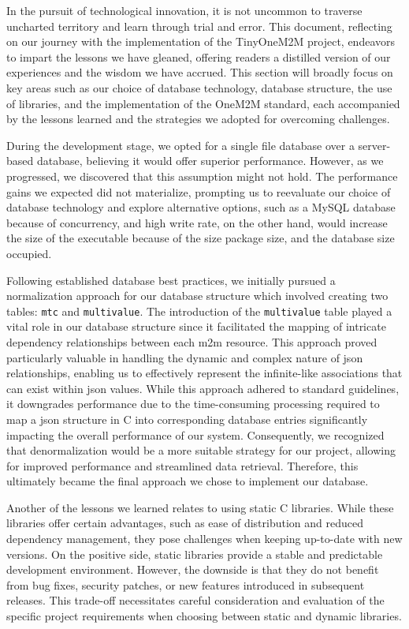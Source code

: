 \documentclass[a4paper,fleqn]{cas-dc}
\begin{document}
In the pursuit of technological innovation, it is not uncommon to traverse uncharted territory and learn through trial and error. This document, reflecting on our journey with the implementation of the TinyOneM2M project, endeavors to impart the lessons we have gleaned, offering readers a distilled version of our experiences and the wisdom we have accrued. This section will broadly focus on key areas such as our choice of database technology, database structure, the use of libraries, and the implementation of the OneM2M standard, each accompanied by the lessons learned and the strategies we adopted for overcoming challenges.

During the development stage, we opted for a single file database over a server-based database, believing it would offer superior performance. However, as we progressed, we discovered that this assumption might not hold. The performance gains we expected did not materialize, prompting us to reevaluate our choice of database technology and explore alternative options, such as a MySQL database because of concurrency, and high write rate, on the other hand, would increase the size of the executable because of the size package size, and the database size occupied.

Following established database best practices, we initially pursued a normalization approach for our database structure which involved creating two tables: \texttt{mtc} and \texttt{multivalue}. The introduction of the \texttt{multivalue} table played a vital role in our database structure since it facilitated the mapping of intricate dependency relationships between each \gls{m2m} resource. This approach proved particularly valuable in handling the dynamic and complex nature of \gls{json} relationships, enabling us to effectively represent the infinite-like associations that can exist within \gls{json} values. While this approach adhered to standard guidelines, it downgrades performance due to the time-consuming processing required to map a \gls{json} structure in C into corresponding database entries significantly impacting the overall performance of our system. Consequently, we recognized that denormalization would be a more suitable strategy for our project, allowing for improved performance and streamlined data retrieval. Therefore, this ultimately became the final approach we chose to implement our database.

Another of the lessons we learned relates to using static C libraries. While these libraries offer certain advantages, such as ease of distribution and reduced dependency management, they pose challenges when keeping up-to-date with new versions. On the positive side, static libraries provide a stable and predictable development environment. However, the downside is that they do not benefit from bug fixes, security patches, or new features introduced in subsequent releases. This trade-off necessitates careful consideration and evaluation of the specific project requirements when choosing between static and dynamic libraries.
\end{document}

